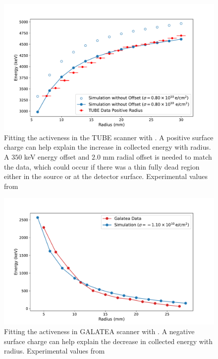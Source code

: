 \begin{figure}%
\includegraphics[trim={0.3cm 0.1cm 1.7cm 0.1cm},clip,width=\linewidth]{ch5/figs/tube_fit.pdf}
\caption{Fitting the activeness in the TUBE scanner with \ehd{}. A positive surface charge can help explain the increase in collected energy with radius. A $350$ keV energy offset and $2.0$ mm radial offset is needed to match the data, which could occur if there was a thin fully dead region either in the source or at the detector surface. Experimental values from \cite{TUBE_paper}}
\label{fig:tube_fit}
\end{figure}


\begin{figure}%
\centering
\includegraphics[trim={0.3cm 0.1cm 1.7cm 1cm},clip,width=\linewidth]{ch5/figs/gal_fit.pdf}
\caption{Fitting the activeness in GALATEA scanner with \ehd{}. A negative surface charge can help explain the decrease in collected energy with radius. Experimental values from \cite{galatea_paper}}
\label{fig:gal_fit}
\end{figure}


